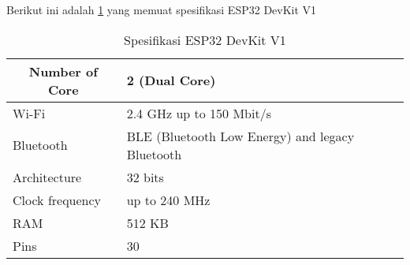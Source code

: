 Berikut ini adalah \cref{tab:spesifikasi} yang memuat spesifikasi ESP32 DevKit V1

\begin{table}[H]
	\caption{Spesifikasi ESP32 DevKit V1}
	\label{tab:spesifikasi}
	\centering
	\begin{tabular}{|l|l|}
		\hline
		\multicolumn{1}{|c|}{Number of Core} & 2 (Dual Core)                                                                                                                                                                                                                                                                \\ \hline
		Wi-Fi                                & 2.4 GHz up to 150 Mbit/s                                                                                                                                                                                                                                                     \\ \hline
		Bluetooth                            & BLE (Bluetooth Low Energy) and legacy Bluetooth                                                                                                                                                                                                                              \\ \hline
		Architecture                         & 32 bits                                                                                                                                                                                                                                                                      \\ \hline
		Clock frequency                      & up to 240 MHz                                                                                                                                                                                                                                                                \\ \hline
		RAM                                  & 512 KB                                                                                                                                                                                                                                                                       \\ \hline
		Pins                                 & 30                                                                                                                                                                                                                                                                           \\ \hline

\end{tabular}
\end{table}
